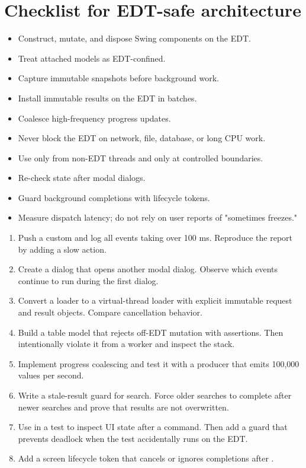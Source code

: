 \section{Checklist for EDT-safe architecture}

\begin{itemize}
\item Construct, mutate, and dispose Swing components on the EDT.
\item Treat attached models as EDT-confined.
\item Capture immutable snapshots before background work.
\item Install immutable results on the EDT in batches.
\item Coalesce high-frequency progress updates.
\item Never block the EDT on network, file, database, or long CPU work.
\item Use  only from non-EDT threads and only at controlled boundaries.
\item Re-check state after modal dialogs.
\item Guard background completions with lifecycle tokens.
\item Measure dispatch latency; do not rely on user reports of "sometimes freezes." 
\end{itemize}

\begin{exercisebox}
\begin{enumerate}
\item Push a custom  and log all events taking over 100 ms. Reproduce the report by adding a slow action.
\item Create a dialog that opens another modal dialog. Observe which events continue to run during the first dialog.
\item Convert a  loader to a virtual-thread loader with explicit immutable request and result objects. Compare cancellation behavior.
\item Build a table model that rejects off-EDT mutation with assertions. Then intentionally violate it from a worker and inspect the stack.
\item Implement progress coalescing and test it with a producer that emits 100,000 values per second.
\item Write a stale-result guard for search. Force older searches to complete after newer searches and prove that results are not overwritten.
\item Use  in a test to inspect UI state after a command. Then add a guard that prevents deadlock when the test accidentally runs on the EDT.
\item Add a screen lifecycle token that cancels or ignores completions after .
\end{enumerate}
\end{exercisebox}


